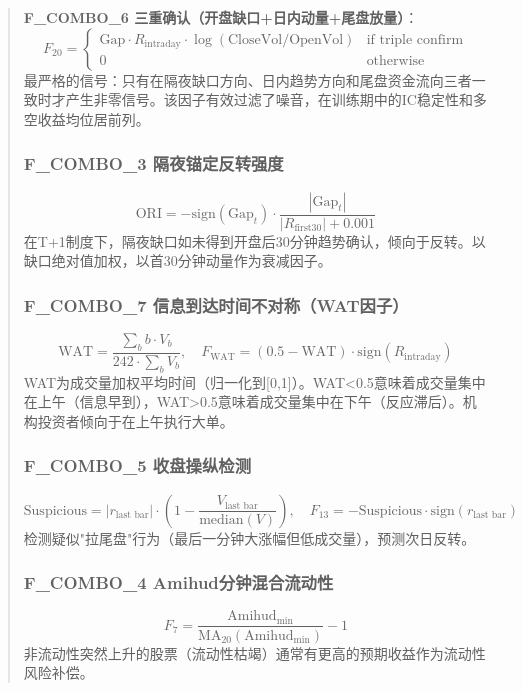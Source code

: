 \documentclass[12pt,a4paper]{article}
\begin{document}
\begin{abstract}
\textbf{F\_COMBO\_6 三重确认（开盘缺口+日内动量+尾盘放量）}：
\begin{equation}
    F_{20} = \begin{cases}
        \text{Gap} \cdot R_{\text{intraday}} \cdot \log(\text{CloseVol}/\text{OpenVol}) & \text{if triple confirm} \\
        0 & \text{otherwise}
    \end{cases}
\end{equation}
最严格的信号：只有在隔夜缺口方向、日内趋势方向和尾盘资金流向三者一致时才产生非零信号。该因子有效过滤了噪音，在训练期中的IC稳定性和多空收益均位居前列。

\subsubsection{F\_COMBO\_3 隔夜锚定反转强度}
\begin{equation}
    \text{ORI} = -\text{sign}(\text{Gap}_t) \cdot \frac{|\text{Gap}_t|}{|R_{\text{first30}}| + 0.001}
\end{equation}
在T+1制度下，隔夜缺口如未得到开盘后30分钟趋势确认，倾向于反转。以缺口绝对值加权，以首30分钟动量作为衰减因子。

\subsubsection{F\_COMBO\_7 信息到达时间不对称（WAT因子）}
\begin{equation}
    \text{WAT} = \frac{\sum_b b \cdot V_b}{242 \cdot \sum_b V_b}, \quad F_{\text{WAT}} = (0.5 - \text{WAT}) \cdot \text{sign}(R_{\text{intraday}})
\end{equation}
WAT为成交量加权平均时间（归一化到[0,1]）。WAT<0.5意味着成交量集中在上午（信息早到），WAT>0.5意味着成交量集中在下午（反应滞后）。机构投资者倾向于在上午执行大单。

\subsubsection{F\_COMBO\_5 收盘操纵检测}
\begin{equation}
    \text{Suspicious} = |r_{\text{last bar}}| \cdot (1 - \frac{V_{\text{last bar}}}{\text{median}(V)}), \quad F_{13} = -\text{Suspicious} \cdot \text{sign}(r_{\text{last bar}})
\end{equation}
检测疑似"拉尾盘"行为（最后一分钟大涨幅但低成交量），预测次日反转。

\subsubsection{F\_COMBO\_4 Amihud分钟混合流动性}
\begin{equation}
    F_7 = \frac{\text{Amihud}_{\text{min}}}{\text{MA}_{20}(\text{Amihud}_{\text{min}})} - 1
\end{equation}
非流动性突然上升的股票（流动性枯竭）通常有更高的预期收益作为流动性风险补偿。


\end{abstract}
\end{document}
